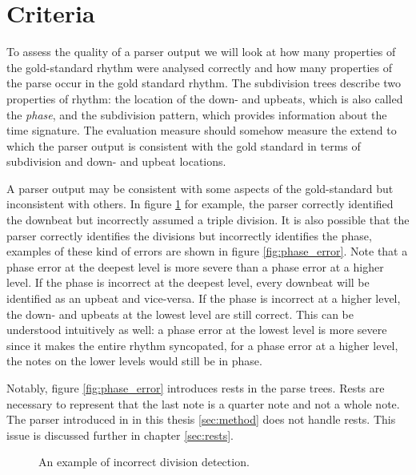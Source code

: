 \section{Criteria}
\label{sec:criteria}

To assess the quality of a parser output we will look at how many properties of the gold-standard rhythm were analysed correctly and how many properties of the parse occur in the gold standard rhythm. The subdivision trees describe two properties of rhythm: the location of the down- and upbeats, which is also called the \textit{phase}, and the subdivision pattern, which provides information about the time signature. The evaluation measure should somehow measure the extend to which the parser output is consistent with the gold standard in terms of subdivision and down- and upbeat locations. 

A parser output may be consistent with some aspects of the gold-standard but inconsistent with others. In figure \ref{fig:div_error} for example, the parser correctly identified the downbeat but incorrectly assumed a triple division. It is also possible that the parser correctly identifies the divisions but incorrectly identifies the phase, examples of these kind of errors are shown in figure \ref{fig:phase_error}. Note that a phase error at the deepest level is more severe than a phase error at a higher level. If the phase is incorrect at the deepest level, every downbeat will be identified as an upbeat and vice-versa. If the phase is incorrect at a higher level, the down- and upbeats at the lowest level are still correct. This can be understood intuitively as well: a phase error at the lowest level is more severe since it makes the entire rhythm syncopated, for a phase error at a higher level, the notes on the lower levels would still be in phase.

Notably, figure \ref{fig:phase_error} introduces rests in the parse trees. Rests are necessary to represent that the last note is a quarter note and not a whole note. The parser introduced in in this thesis \ref{sec:method} does not handle rests. This issue is discussed further in chapter \ref{sec:rests}.
\begin{figure}
\centering
{}
\caption{An example of incorrect division detection.}
\label{fig:div_error}
\end{figure}


